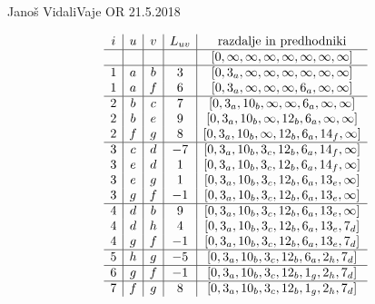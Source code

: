 \begin{naloga}{Janoš Vidali}{Vaje OR 21.5.2018}
\begin{odgovor}
\begin{tabela}
$$
\begin{array}{c|c|c|c|c}
i & u & v & L_{uv} & \text{razdalje in predhodniki} \\ \hline
  &   &   &    & [0, \infty, \infty, \infty, \infty, \infty, \infty, \infty] \\ \hline
1 & a & b &  3 & [0, 3_a, \infty, \infty, \infty, \infty, \infty, \infty] \\
1 & a & f &  6 & [0, 3_a, \infty, \infty, \infty, 6_a, \infty, \infty] \\ \hline
2 & b & c &  7 & [0, 3_a, 10_b, \infty, \infty, 6_a, \infty, \infty] \\
2 & b & e &  9 & [0, 3_a, 10_b, \infty, 12_b, 6_a, \infty, \infty] \\
2 & f & g &  8 & [0, 3_a, 10_b, \infty, 12_b, 6_a, 14_f, \infty] \\ \hline
3 & c & d & -7 & [0, 3_a, 10_b, 3_c, 12_b, 6_a, 14_f, \infty] \\
3 & e & d &  1 & [0, 3_a, 10_b, 3_c, 12_b, 6_a, 14_f, \infty] \\
3 & e & g &  1 & [0, 3_a, 10_b, 3_c, 12_b, 6_a, 13_e, \infty] \\
3 & g & f & -1 & [0, 3_a, 10_b, 3_c, 12_b, 6_a, 13_e, \infty] \\ \hline
4 & d & b &  9 & [0, 3_a, 10_b, 3_c, 12_b, 6_a, 13_e, \infty] \\
4 & d & h &  4 & [0, 3_a, 10_b, 3_c, 12_b, 6_a, 13_e, 7_d] \\
4 & g & f & -1 & [0, 3_a, 10_b, 3_c, 12_b, 6_a, 13_e, 7_d] \\ \hline
5 & h & g & -5 & [0, 3_a, 10_b, 3_c, 12_b, 6_a, 2_h, 7_d] \\ \hline
6 & g & f & -1 & [0, 3_a, 10_b, 3_c, 12_b, 1_g, 2_h, 7_d] \\ \hline
7 & f & g &  8 & [0, 3_a, 10_b, 3_c, 12_b, 1_g, 2_h, 7_d]
\end{array}
$$
\end{tabela}

\begin{slika}
\pgfslika[bf-resitev]
\end{slika}
\end{odgovor}
\end{naloga}
